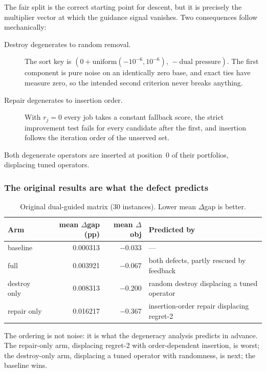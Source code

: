 \documentclass[11pt,a4paper]{article}
\begin{document}
The fair split is the correct starting point for descent, but it is precisely the
multiplier vector at which the guidance signal vanishes. Two consequences follow
mechanically:

\begin{description}
  \item[Destroy degenerates to random removal.] The sort key is
    $(0+\text{uniform}(-10^{-6},10^{-6}),\,-\text{dual pressure})$. The first
    component is pure noise on an identically zero base, and exact ties have
    measure zero, so the intended second criterion never breaks anything.
  \item[Repair degenerates to insertion order.] With $r_j=0$ every job takes a
    constant fallback score, the strict improvement test fails for every candidate
    after the first, and insertion follows the iteration order of the unserved
    set.
\end{description}

Both degenerate operators are inserted at position~0 of their portfolios,
displacing tuned operators.

\subsubsection{The original results are what the defect predicts}

\begin{table}[htbp]
\centering
\caption{Original dual-guided matrix (30 instances). Lower mean $\Delta$gap is
better.}
\label{tab:h2-orig}
\begin{tabular}{lrrl}
\toprule
Arm & mean $\Delta$gap (pp) & mean $\Delta$obj & Predicted by \\
\midrule
baseline     & 0.000313 & $-0.033$ & --- \\
full         & 0.003921 & $-0.067$ & both defects, partly rescued by feedback \\
destroy only & 0.008313 & $-0.200$ & random destroy displacing a tuned operator \\
repair only  & 0.016217 & $-0.367$ & insertion-order repair displacing regret-2 \\
\bottomrule
\end{tabular}
\end{table}

The ordering is not noise: it is what the degeneracy analysis predicts in advance.
The repair-only arm, displacing regret-2 with order-dependent insertion, is worst;
the destroy-only arm, displacing a tuned operator with randomness, is next; the
baseline wins.
\end{document}

